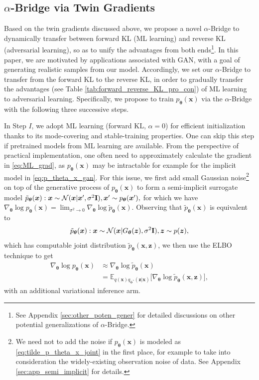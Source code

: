 \documentclass[letterpaper]{article} %
\newcommand{\beq}{\begin{equation}}
\newcommand{\eeq}{\end{equation}}
\newcommand{\bali}{\begin{aligned}}
\newcommand{\eali}{\end{aligned}}
\newcommand{\Nc}[0]{\ensuremath{\mathcal{N}} }
\newcommand{\Ebb}[0]{\ensuremath{\mathbb{E}} }
\newcommand{\Imat}[0]{\ensuremath{{\bf I}} }
\newcommand{\xv}[0]{\ensuremath{\boldsymbol{x}} }
\newcommand{\zv}[0]{\ensuremath{\boldsymbol{z}} }
\newcommand{\thetav}[0]{\ensuremath{\boldsymbol{\theta}} }
\newcommand{\phiv}[0]{\ensuremath{\boldsymbol{\phi}} }
\begin{document}
\subsection{$\alpha$-Bridge via Twin Gradients}
\label{sec:alpha_bridge}




Based on the twin gradients discussed above, we propose a novel $\alpha$-Bridge to dynamically transfer between forward KL (ML learning) and reverse KL (adversarial learning), so as to unify the advantages from both ends\footnote{See
	Appendix \ref{sec:other_poten_gener}
	for detailed discussions on other potential generalizations of $\alpha$-Bridge.}.
In this paper, we are motivated by applications associated with GAN, with a goal of generating realistic samples from our model. Accordingly, we set our $\alpha$-Bridge to transfer from the forward KL to the reverse KL, in order to gradually transfer the advantages (see Table \ref{tab:forward_reverse_KL_pro_con}) of ML learning to adversarial learning.
Specifically, we propose to train $p_{\thetav}(\xv)$ via the $\alpha$-Bridge with the following three successive steps.

In Step $I$, we adopt ML learning (forward KL, $\alpha=0$) for efficient initialization thanks to its mode-covering and stable-training properties. One can skip this step if pretrained models from ML learning are available.
From the perspective of practical implementation, one often need to approximately calculate the gradient in \eqref{eq:ML_grad}, as $p_{\thetav}(\xv)$ may be intractable for example for the implicit model in \eqref{eq:p_theta_x_gan}.
For this issue, we first add small Gaussian noise\footnote{We need not to add the noise if $p_{\thetav}(\xv)$ is modeled as \eqref{eq:tilde_p_theta_x_joint} in the first place, for example to take into consideration the widely-existing observation noise of data. See
Appendix \ref{sec:app_semi_implicit}
for details. }
on top of the generative process of $p_{\thetav}(\xv)$ to form a semi-implicit surrogate model \cite{yin2018semi}
$
\tilde p_{\thetav}(\xv): \xv \sim \Nc(\xv | \xv', \sigma^2 \Imat), \xv' \sim p_{\thetav}(\xv'),
$
for which we have $\nabla_{\thetav} \log p_{\thetav}(\xv) = \lim_{\sigma^2 \to 0} \nabla_{\thetav} \log \tilde p_{\thetav}(\xv)$.
Observing that $\tilde p_{\thetav}(\xv)$ is equivalent to
\beq\label{eq:tilde_p_theta_x_joint}
\tilde p_{\thetav}(\xv): \xv \sim \Nc(\xv | G_{\thetav}(\zv), \sigma^2 \Imat), \zv \sim p(\zv),
\eeq
which has computable joint distribution $\tilde p_{\thetav}(\xv , \zv)$,
we then use the ELBO technique to get
\beq\label{eq:approx_grad_loglike}
\bali
\nabla_{\thetav} \log p_{\thetav}(\xv)
& \approx \nabla_{\thetav} \log \tilde p_{\thetav}(\xv)
\\ &
= \Ebb_{q(\xv) q_{\phiv^{*}}(\zv|\xv)} \big[
\nabla_{\thetav} \log \tilde p_{\thetav}(\xv, \zv)
\big],
\eali
\eeq
with an additional variational inference arm.
\end{document}
